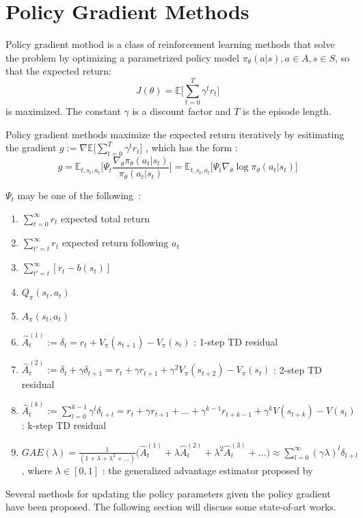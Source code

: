 \section{Policy Gradient Methods}
Policy gradient mothod is a class of reinforcement learning methods that solve the problem by optimizing a parametrized policy model $\pi_\theta (a|s), a\in A, s\in S$, so that the expected return:
$$
    J(\theta) = \mathbb{E}\big[\sum_{t=0}^T\gamma^t r_t \big]
$$
is maximized. The constant $\gamma$ is a discount factor and $T$ is the episode length.

Policy gradient methods maximize the expected return iteratively by esitimating the gradient $g := \nabla  \mathbb{E}\big[\sum_{t=0}^T\gamma^t r_t \big]$ , which has the form \cite{schulman2015high}:
\begin{equation} g = \mathbb{E}_{t,s_t,a_t} \big[
\Psi_t \frac{\nabla_\theta \pi_\theta(a_t|s_t) }{\pi_\theta(a_t|s_t)}
\big]
=\mathbb{E}_{t,s_t,a_t} \big[
\Psi_t \nabla_\theta \log \pi_\theta(a_t|s_t) 
\big]
\label{pg_def}\end{equation}


$\Psi_t$ may be one of the following~\cite{schulman2015high}:
\begin{enumerate}
    \item $\sum_{t=0}^{\infty} r_t$ expected total return
    \item $\sum_{t'=t}^{\infty} r_t$ expected return following $a_t$
    \item $\sum_{t'=t}^{\infty} [r_t - b(s_t)]$
    \item $Q_\pi (s_t, a_t)$
    \item $A_\pi (s_t, a_t)$
    \item $ \hat{A}_t^{(1)}:=  \delta_t = r_t + V_\pi (s_{t+1}) - V_\pi (s_{t})$ : 1-step TD residual
    \item $ \hat{A}_t^{(2)} :=  \delta_t + \gamma \delta_{t+1}= r_t +\gamma r_{t+1} + \gamma^2 V_\pi (s_{t+2}) - V_\pi (s_{t})$ : 2-step TD residual
    \item $\hat{A}_t^{(k)} := \sum_{l=0}^{k-1} \gamma^{l} \delta_{t+l} =   r_t + \gamma r_{t+1} + \dots + \gamma^{k-1} r_{t+k-1} + \gamma^{k} V(s_{t+k}) -V(s_t)$ : k-step TD residual
    \item $GAE(\lambda) = \frac{1}{(1+\lambda+\lambda^2+\dots)} \big(\hat{A}_t^{(1)} + \lambda \hat{A}_t^{(2)}+ \lambda^2 \hat{A}_t^{(3)} +\dots \big) 
    \approx \sum_{l=0}^{\infty} (\gamma \lambda)^l \delta_{t+l}$ , where $\lambda \in [0,1]$ : the generalized advantage estimator proposed by \cite{schulman2015high}
\end{enumerate}
Several methods for updating the policy parameters given the policy gradient have been proposed. The following section will discuss some state-of-art works.
